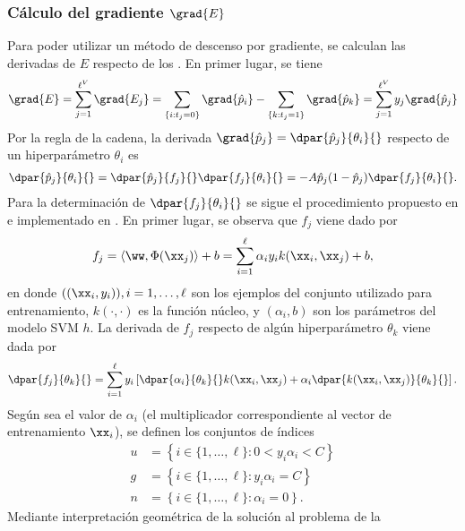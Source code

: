 %
\subsubsection{Cálculo del gradiente $\grad{E}$}
%
Para poder utilizar un método de descenso por gradiente, se calculan
las derivadas de $E$ respecto de los . En primer lugar, se tiene
%
\begin{align}
\label{gradE}
  \grad{E} = \sum_{j=1}^{\ell^V} \grad{E_j} =
  \sum_{ \{i:t_j=0\}  } \grad{\hat{p}_i}
  - \sum_{ \{k:t_j=1\}  } \grad{\hat{p}_k}
  = \sum_{j=1}^{\ell^V} y_j \grad{\hat{p}_j}
\end{align}
%
Por la regla de la cadena, la derivada
$\grad{\hat{p}_j}=\dpar{\hat{p}_j}{\theta_i}{}$ respecto de un
hiperparámetro ${\theta_i}$ es
%
\begin{align}
  \dpar{\hat{p}_j}{\theta_i}{} =
  \dpar{\hat{p}_j}{f_j}{}\dpar{f_j}{\theta_i}{} =
  -A\hat{p}_j(1-\hat{p}_j)\dpar{f_j}{\theta_i}{}.
  \label{eq:deriv-pk-thetak}
\end{align}
%
Para la determinación de $\dpar{f_j}{\theta_i}{}$ se sigue el
procedimiento propuesto en \cite{keerthi,glasmachers} e implementado
en \cite{shark}. En primer lugar, se observa que $f_j$ viene dado por
%
\begin{align}
  f_j = \langle \ww,\Phi(\xx_j)\rangle+b = \sum_{i=1}^\ell \alpha_i y_i k(\xx_i,\xx_j) + b,
  \label{fk}
\end{align}
%
en donde $((\xx_i,y_i)),i=1,\ldots,\ell$ son los ejemplos del conjunto
utilizado para entrenamiento, $k(\cdot,\cdot)$ es la función
núcleo, y $(\alpha_i, b)$ son los parámetros del modelo SVM $h$.
La derivada de $f_j$ respecto de algún hiperparámetro $\theta_k$ viene
dada por
\begin{align}
  \dpar{f_j}{\theta_k}{} = \sum_{i=1}^\ell y_i
  \left[\dpar{\alpha_i}{\theta_k}{} k(\xx_i,\xx_j) + \alpha_i
    \dpar{k(\xx_i,\xx_j)}{\theta_k}{} \right].
\end{align}
%
Según sea el valor de $\alpha_i$ (el multiplicador correspondiente al
vector de entrenamiento $\xx_i$), se definen los conjuntos de índices
%
\begin{align}
  \label{unbounded-sv-set}
  u &= \left\{i\in\{1,\ldots,\ell\}:0<y_i\alpha_i<C \right\}\\
  \label{bounded-sv-set}
  g &= \left\{i\in\{1,\ldots,\ell\}: y_i\alpha_i=C \right\}\\
  n &= \left\{i\in\{1,\ldots,\ell\}: \alpha_i=0 \right\}.
\end{align}
%
Mediante interpretación geométrica de la solución al problema de la
